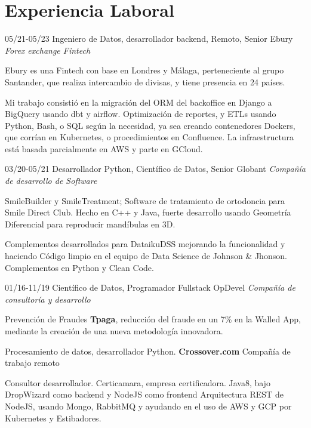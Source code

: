 \section{Experiencia Laboral}

\begin{entrylist}
  \entry
    {05/21-05/23}       
    {Ingeniero de Datos, desarrollador backend, Remoto, Senior}
    {Ebury {\sl Forex exchange Fintech}}
    {Ebury es una Fintech con base en Londres y Málaga, perteneciente al grupo Santander, que realiza intercambio
de divisas, y tiene presencia en 24 países.

     Mi trabajo consistió en la migración del ORM del backoffice en Django a BigQuery usando dbt y airflow. Optimización de reportes, y ETLs usando Python, Bash, o SQL según la necesidad, ya sea creando contenedores Dockers, que corrían en Kubernetes, o procedimientos en Confluence. La infraestructura está basada parcialmente en AWS y parte en GCloud.}
  \entry
    {03/20-05/21}
    {Desarrollador Python, Científico de Datos, Senior}
    {Globant {\sl Compañía de desarrollo de Software}}
	{SmileBuilder y SmileTreatment; Software de tratamiento de ortodoncia para Smile Direct Club. Hecho en C++ y Java,
fuerte desarrollo usando Geometría Diferencial para reproducir mandíbulas en 3D.

Complementos desarrollados para DataikuDSS mejorando la funcionalidad y haciendo
Código limpio en el equipo de Data Science de Johnson \& Jhonson. Complementos en Python y Clean Code.}
  \entry
    {01/16-11/19}
    {Científico de Datos, Programador Fullstack}
    {OpDevel {\sl Compañía de consultoría y desarrollo}}
    {Prevención de Fraudes \textbf{Tpaga}, reducción del fraude en un 7\% en la Walled App, mediante la
creación de una nueva metodología innovadora.

Procesamiento de datos, desarrollador Python. \textbf{Crossover.com} Compañía de trabajo remoto

Consultor desarrollador. Certicamara, empresa certificadora. Java8, bajo
DropWizard como backend y NodeJS como frontend Arquitectura REST de NodeJS,
usando Mongo, RabbitMQ y ayudando en el uso de AWS y GCP por Kubernetes
y Estibadores.}
\end{entrylist}

\newpage


